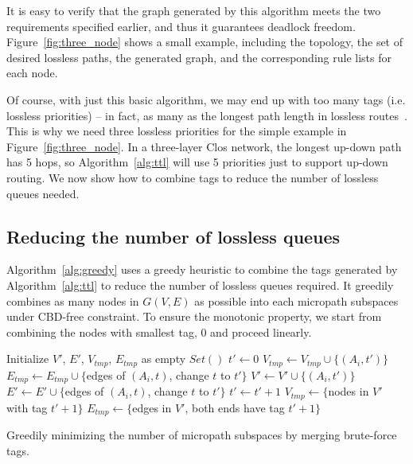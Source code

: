 It is easy to verify that the graph generated by this algorithm meets the two
requirements specified earlier, and thus it guarantees deadlock freedom.
Figure~\ref{fig:three_node} shows a small example, including the topology, the
set of desired lossless paths, the generated graph, and the corresponding rule
lists for each node.  

Of course, with just this basic algorithm, we may end up with too many tags
(i.e. lossless priorities) -- in fact, as many as the longest path length in
lossless routes~\cite{xxx}. This is why we need three lossless priorities for
the simple example in Figure~\ref{fig:three_node}. In a three-layer Clos
network, the longest up-down path has 5 hops, so Algorithm~\ref{alg:ttl} will use 5
priorities just to support up-down routing. We now show how to combine tags to
reduce the number of lossless queues needed.

\subsection{Reducing the number of lossless queues} 

Algorithm~\ref{alg:greedy} uses a greedy heuristic to combine the tags generated
by Algorithm~\ref{alg:ttl} to reduce the number of lossless queues required.  It
greedily combines as many nodes in $G(V,E)$ as possible into each micropath
subspaces under CBD-free constraint. To ensure the monotonic property, we start
from combining the nodes with smallest tag, 0 and proceed linearly.

\begin{algorithm}[t]
	\small
	Initialize $V'$, $E'$, $V_{tmp}$, $E_{tmp}$ as empty $Set()$\;
	$t' \gets 0$\;
	 {
		 {
			$V_{tmp} \gets V_{tmp} \cup \{(A_i, t')\}$\;
			$E_{tmp} \gets E_{tmp} \cup \{$edges of $(A_i, t)$, change $t$ to $t'\}$\;
			 {
				$V' \gets V' \cup \{(A_i, t')\}$\;
				$E' \gets E' \cup \{$edges of $(A_i, t)$, change $t$ to $t'\}$\; 
			}
		}
		 {
			$t' \gets t'+1$\;
			$V_{tmp} \gets \{$nodes in $V'$ with tag $t'+1\}$\;
			$E_{tmp} \gets \{$edges in $V'$, both ends have tag $t'+1\}$\;
		}
	}
	\;
    \caption{Greedily minimizing the number of micropath subspaces by merging brute-force tags.}
	\label{alg:greedy}
\end{algorithm}


